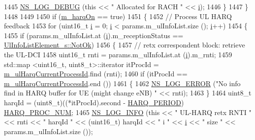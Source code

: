 \begin{DoxyCode}
1445           \hyperlink{group__logging_ga413f1886406d49f59a6a0a89b77b4d0a}{NS\_LOG\_DEBUG} (\textcolor{keyword}{this} << \textcolor{stringliteral}{" Allocated for RACH "} << \hyperlink{bernuolliDistribution_8m_a6f6ccfcf58b31cb6412107d9d5281426}{i});
1446         \}
1447     \}
1448 
1449 
1450   \textcolor{keywordflow}{if} (\hyperlink{classns3_1_1TtaFfMacScheduler_a08875f91819cf2e7cf2ed3781d36cda1}{m\_harqOn} == \textcolor{keyword}{true})
1451     \{
1452       \textcolor{comment}{//   Process UL HARQ feedback}
1453       \textcolor{keywordflow}{for} (uint16\_t \hyperlink{bernuolliDistribution_8m_a6f6ccfcf58b31cb6412107d9d5281426}{i} = 0; \hyperlink{bernuolliDistribution_8m_a6f6ccfcf58b31cb6412107d9d5281426}{i} < params.m\_ulInfoList.size (); \hyperlink{bernuolliDistribution_8m_a6f6ccfcf58b31cb6412107d9d5281426}{i}++)
1454         \{        
1455           \textcolor{keywordflow}{if} (params.m\_ulInfoList.at (\hyperlink{bernuolliDistribution_8m_a6f6ccfcf58b31cb6412107d9d5281426}{i}).m\_receptionStatus == 
      \hyperlink{structns3_1_1UlInfoListElement__s_a2a4dff5145d25c81086660e991db6f61a98aed738fd24811d3461668e394a53c8}{UlInfoListElement\_s::NotOk})
1456             \{
1457               \textcolor{comment}{// retx correspondent block: retrieve the UL-DCI}
1458               uint16\_t rnti = params.m\_ulInfoList.at (\hyperlink{bernuolliDistribution_8m_a6f6ccfcf58b31cb6412107d9d5281426}{i}).m\_rnti;
1459               std::map <uint16\_t, uint8\_t>::iterator itProcId = 
      \hyperlink{classns3_1_1TtaFfMacScheduler_af8bd1675d63b73c0374a39180e1cbf54}{m\_ulHarqCurrentProcessId}.find (rnti);
1460               \textcolor{keywordflow}{if} (itProcId == \hyperlink{classns3_1_1TtaFfMacScheduler_af8bd1675d63b73c0374a39180e1cbf54}{m\_ulHarqCurrentProcessId}.end ())
1461                 \{
1462                   \hyperlink{group__logging_ga0261a8db1d4ac5f79417d117634fd455}{NS\_LOG\_ERROR} (\textcolor{stringliteral}{"No info find in HARQ buffer for UE (might change eNB) "} << 
      rnti);
1463                 \}
1464               uint8\_t harqId = (uint8\_t)((*itProcId).second - \hyperlink{lte-common_8h_a275321ee206f130c3ddc81fcdaa13cfd}{HARQ\_PERIOD}) %
      \hyperlink{cqa-ff-mac-scheduler_8h_a9185d8d7d2b2979181d4a7044a3d3555}{HARQ\_PROC\_NUM};
1465               \hyperlink{group__logging_gafbd73ee2cf9f26b319f49086d8e860fb}{NS\_LOG\_INFO} (\textcolor{keyword}{this} << \textcolor{stringliteral}{" UL-HARQ retx RNTI "} << rnti << \textcolor{stringliteral}{" harqId "} << (uint16\_t)
      harqId << \textcolor{stringliteral}{" i "} << \hyperlink{bernuolliDistribution_8m_a6f6ccfcf58b31cb6412107d9d5281426}{i} << \textcolor{stringliteral}{" size "}  << params.m\_ulInfoList.size ());

\end{DoxyCode}
